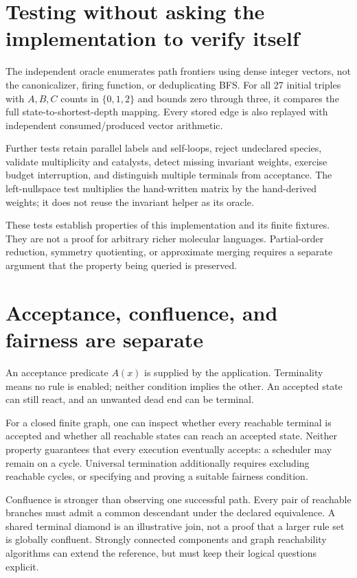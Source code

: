 \section{Testing without asking the implementation to verify itself}
The independent oracle enumerates path frontiers using dense integer vectors,
not the canonicalizer, firing function, or deduplicating BFS. For all 27 initial
triples with $A,B,C$ counts in $\{0,1,2\}$ and bounds zero through three, it compares
the full state-to-shortest-depth mapping. Every stored edge is also replayed with
independent consumed/produced vector arithmetic.

Further tests retain parallel labels and self-loops, reject undeclared species,
validate multiplicity and catalysts, detect missing invariant weights, exercise
budget interruption, and distinguish multiple terminals from acceptance. The
left-nullspace test multiplies the hand-written matrix by the hand-derived
weights; it does not reuse the invariant helper as its oracle.

These tests establish properties of this implementation and its finite fixtures.
They are not a proof for arbitrary richer molecular languages. Partial-order
reduction, symmetry quotienting, or approximate merging requires a separate
argument that the property being queried is preserved.

\section{Acceptance, confluence, and fairness are separate}
An acceptance predicate $A(x)$ is supplied by the application. Terminality means
no rule is enabled; neither condition implies the other. An accepted state can
still react, and an unwanted dead end can be terminal.

For a closed finite graph, one can inspect whether every reachable terminal is
accepted and whether all reachable states can reach an accepted state. Neither
property guarantees that every execution eventually accepts: a scheduler may
remain on a cycle. Universal termination additionally requires excluding reachable
cycles, or specifying and proving a suitable fairness condition.

Confluence is stronger than observing one successful path. Every pair of reachable
branches must admit a common descendant under the declared equivalence. A shared
terminal diamond is an illustrative join, not a proof that a larger rule set is
globally confluent. Strongly connected components and graph reachability algorithms
can extend the reference, but must keep their logical questions explicit.

